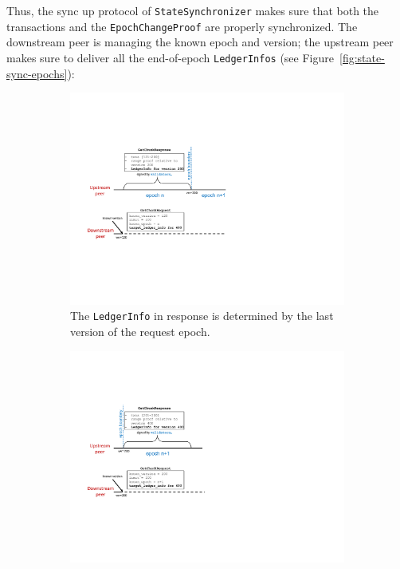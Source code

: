 \documentclass[letterpaper,10pt]{article}
\begin{document}
Thus, the sync up protocol of \texttt{StateSynchronizer} makes sure that both the transactions and the \texttt{EpochChangeProof} are properly synchronized. The downstream peer is managing the known epoch and version; the upstream peer makes sure to deliver all the end-of-epoch \texttt{LedgerInfos} (see Figure~\ref{fig:state-sync-epochs}):

\begin{figure}[ht]
    \centering
    \begin{subfigure}{0.47\textwidth}
        \centering
        \includegraphics[height=0.8\textwidth]{figures/state-sync-epochs-1.pdf}
        \caption{\footnotesize{The \texttt{LedgerInfo} in response is determined by the last version of the request epoch.}}
        \label{fig:state-sync-epochs-1}
    \end{subfigure}
    \begin{subfigure}{0.47\textwidth}
        \centering
        \includegraphics[height=0.8\textwidth]{figures/state-sync-epochs-2.pdf}

\end{subfigure}
\end{figure}
\end{document}
